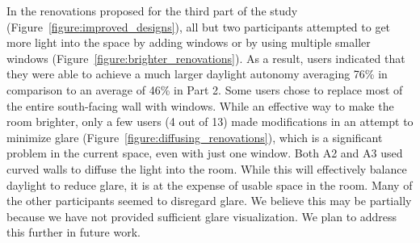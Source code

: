 In the renovations proposed for the third part of the study
(Figure~\ref{figure:improved_designs}), all but two participants
attempted to get more light into the space by adding windows or by
using multiple smaller windows
(Figure~\ref{figure:brighter_renovations}).
%
As a result, users indicated that they were able to achieve a much
larger daylight autonomy averaging 76\% in comparison to an average of
46\% 
in Part 2.  Some users chose to replace most of the entire
south-facing wall with windows.  While an effective way to make the
room brighter, only a few users (4 out of 13) made modifications in an
attempt to minimize glare (Figure~\ref{figure:diffusing_renovations}),
which is a significant problem in the current space, even with just
one window.  Both A2 and A3 used curved walls to diffuse the light
into the room.  While this will effectively balance daylight to reduce
glare, it is at the expense of usable space in the room.  
Many of the other participants seemed to disregard glare.  We believe
this may be partially because we have not provided sufficient glare
visualization.  We plan to address this further in future work.



